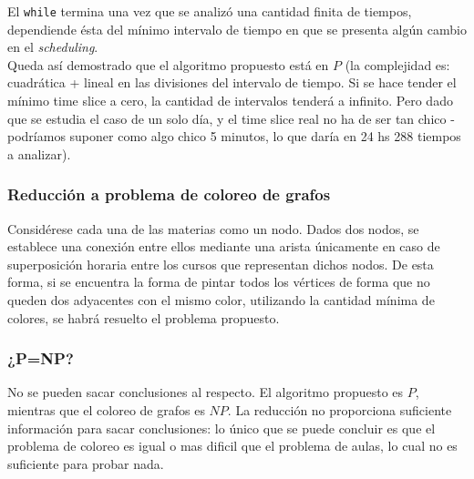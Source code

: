 \documentclass{article}
\begin{document}
El \texttt{while} termina una vez que se analizó una cantidad finita de tiempos, dependiende ésta del mínimo intervalo de tiempo en que se presenta algún cambio en el \textit{scheduling}.\\

Queda así demostrado que el algoritmo propuesto está en $P$ (la complejidad es: cuadrática + lineal en las divisiones del intervalo de tiempo. Si se hace tender el mínimo time slice a cero, la cantidad de intervalos tenderá a infinito. Pero dado que se estudia el caso de un solo día, y el time slice real no ha de ser tan chico - podríamos suponer como algo chico 5 minutos, lo que daría en 24 hs 288 tiempos a analizar).
\subsubsection{Reducción a problema de coloreo de grafos}
Considérese cada una de las materias como un nodo. Dados dos nodos, se establece una conexión entre ellos mediante una arista únicamente en caso de superposición horaria entre los cursos que representan dichos nodos. De esta forma, si se encuentra la forma de pintar todos los vértices de forma que no queden dos adyacentes con el mismo color, utilizando la cantidad mínima de colores, se habrá resuelto el problema propuesto.
\subsubsection{¿P=NP?}
No se pueden sacar conclusiones al respecto. El algoritmo propuesto es $P$, mientras que el coloreo de grafos es $NP$. La reducción no proporciona suficiente información para sacar conclusiones: lo único que se puede concluir es que el problema de coloreo es igual o mas dificil que el problema de aulas, lo cual no es suficiente para probar nada.
\end{document}
